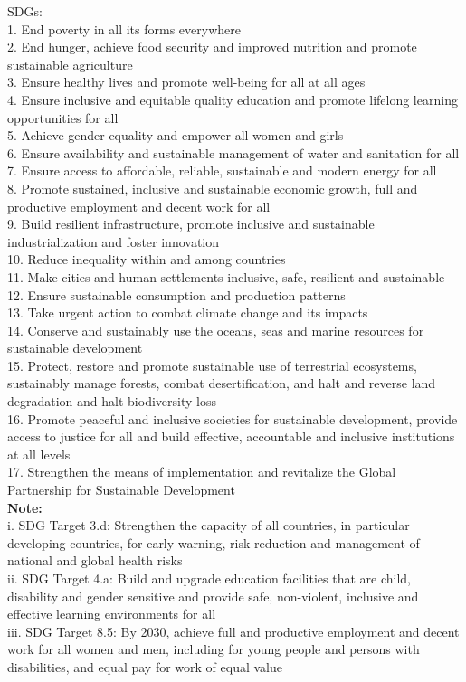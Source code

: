 \begin{appendices}
SDGs: \\
1. End poverty in all its forms everywhere  \\
2. End hunger, achieve food security and improved nutrition and promote
sustainable agriculture \\
3. Ensure healthy lives and promote well-being for all at all ages \\
4. Ensure inclusive and equitable quality education and promote lifelong
learning opportunities for all \\
5. Achieve gender equality and empower all women and girls \\
6. Ensure availability and sustainable management of water and sanitation
for all \\
7. Ensure access to affordable, reliable, sustainable and modern energy for
all \\
8. Promote sustained, inclusive and sustainable economic growth, full and
productive employment and decent work for all \\
9. Build resilient infrastructure, promote inclusive and sustainable
industrialization and foster innovation \\
10. Reduce inequality within and among countries \\
11. Make cities and human settlements inclusive, safe, resilient and
sustainable \\
12. Ensure sustainable consumption and production patterns \\
13. Take urgent action to combat climate change and its impacts \\
14. Conserve and sustainably use the oceans, seas and marine resources
for sustainable development \\
15. Protect, restore and promote sustainable use of terrestrial ecosystems,
sustainably manage forests, combat desertification, and halt and reverse land
degradation and halt biodiversity loss \\
16. Promote peaceful and inclusive societies for sustainable development,
provide access to justice for all and build effective, accountable and inclusive
institutions at all levels \\
17. Strengthen the means of implementation and revitalize the Global
Partnership for Sustainable Development \\

\textbf{Note:}\\
i. SDG Target 3.d: Strengthen the capacity of all countries, in particular developing countries, for early warning, risk reduction and management of national and global health risks\\
ii. SDG Target 4.a: Build and upgrade education facilities that are child, disability and gender sensitive and provide safe, non-violent, inclusive and effective learning environments for all\\
iii. SDG Target 8.5: By 2030, achieve full and productive employment and decent work for all women and men, including for young people and persons with disabilities, and equal pay for work of equal value


\end{appendices}
